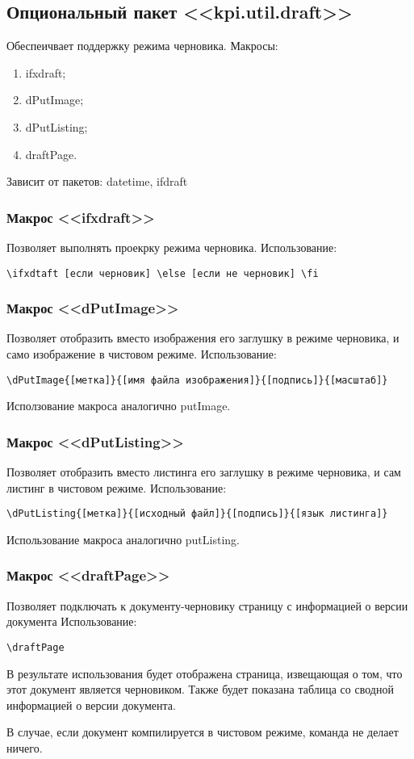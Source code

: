 \subsection{Опциональный пакет <<kpi.util.draft>>}
Обеспеичвает поддержку режима черновика.
Макросы:
\begin{enumerate}
\item ifxdraft;
\item dPutImage;
\item dPutListing;
\item draftPage.
\end{enumerate}
Зависит от пакетов: datetime, ifdraft 

\subsubsection{Макрос <<ifxdraft>>}
Позволяет выполнять проекрку режима черновика.
Использование:{\small
\begin{Verbatim}
\ifxdtaft [если черновик] \else [если не черновик] \fi
\end{Verbatim}}
\normalsize

\subsubsection{Макрос <<dPutImage>>}
Позволяет отобразить вместо изображения его заглушку в режиме черновика, и само изображение в чистовом режиме.
Использование:{\small
\begin{Verbatim}
\dPutImage{[метка]}{[имя файла изображения]}{[подпись]}{[масштаб]}
\end{Verbatim}}
\normalsize
Исползование макроса аналогично putImage.

\subsubsection{Макрос <<dPutListing>>}
Позволяет отобразить вместо листинга его заглушку в режиме черновика, и сам листинг в чистовом режиме.
Использование:{\small
\begin{Verbatim}
\dPutListing{[метка]}{[исходный файл]}{[подпись]}{[язык листинга]}
\end{Verbatim}}
\normalsize
Использование макроса аналогично putListing.

\subsubsection{Макрос <<draftPage>>}
Позволяет подключать к документу-черновику страницу с информацией о версии документа
Использование:{\small
\begin{Verbatim}
\draftPage
\end{Verbatim}}
\normalsize
В результате использования будет отображена страница, извещающая о том, что этот документ является черновиком. Также будет показана таблица со сводной информацией о версии документа.\par
В случае, если документ компилируется в чистовом режиме, команда не делает ничего.